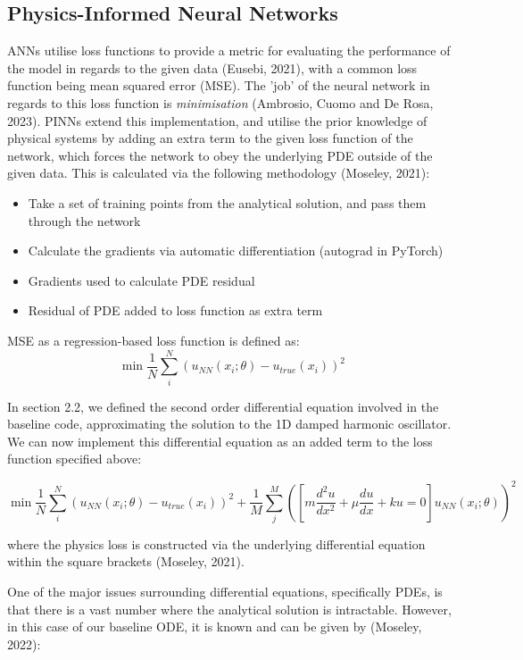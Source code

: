 \documentclass[12pt, openany]{book}
\begin{document}
\subsection{Physics-Informed Neural Networks}

ANNs utilise loss functions to provide a metric for evaluating the performance of the model in regards to the given data (Eusebi, 2021), with a common loss function being mean squared error (MSE). The 'job' of the neural network in regards to this loss function is \textit{minimisation} (Ambrosio, Cuomo and De Rosa, 2023). PINNs extend this implementation, and utilise the prior knowledge of physical systems by adding an extra term to the given loss function of the network, which forces the network to obey the underlying PDE outside of the given data. This is calculated via the following methodology (Moseley, 2021):

\begin{itemize}
    \item Take a set of training points from the analytical solution, and pass them through the network
    \item Calculate the gradients via automatic differentiation (autograd in PyTorch)
    \item Gradients used to calculate PDE residual
    \item Residual of PDE added to loss function as extra term
\end{itemize}

MSE as a regression-based loss function is defined as: \\

\[\min\frac{1}{N}\sum_{i}^{N} (u_{NN}(x_{i};\theta) - u_{true}(x_{i}))^2\]

In section 2.2, we defined the second order differential equation involved in the baseline code, approximating the solution to the 1D damped harmonic oscillator. We can now implement this differential equation as an added term to the loss function specified above:

\[
\min\frac{1}{N}\sum_{i}^{N} (u_{NN}(x_{i};\theta) - u_{true}(x_{i}))^2 + \frac{1}{M}\sum_{j}^{M}\left(\left[m\frac{d^2u}{dx^2}+\mu\frac{du}{dx}+ku=0\right] u_{NN}(x_{i};\theta)\right)^2
\]

where the physics loss is constructed via the underlying differential equation within the square brackets (Moseley, 2021). 

One of the major issues surrounding differential equations, specifically PDEs, is that there is a vast number where the analytical solution is intractable. However, in this case of our baseline ODE, it is known and can be given by (Moseley, 2022):
\end{document}
